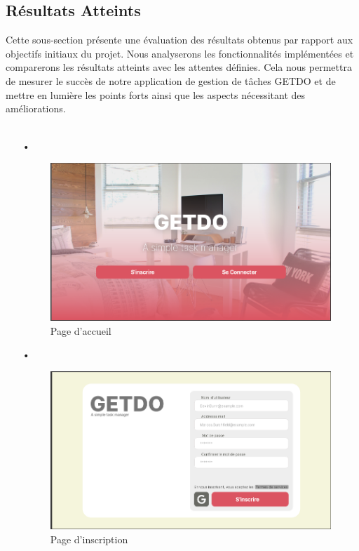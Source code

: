 \documentclass[a4paper,12pt]{report}
\begin{document}
    \subsection{Résultats Atteints}
    Cette sous-section présente une évaluation des résultats obtenus par rapport aux objectifs initiaux du projet. Nous analyserons les fonctionnalités implémentées et comparerons les résultats atteints avec les attentes définies. Cela nous permettra de mesurer le succès de notre application de gestion de tâches GETDO et de mettre en lumière les points forts ainsi que les aspects nécessitant des améliorations.\\ \\
    
    \begin{itemize}
       
      \item[•]\begin{figure}[h!]
          \includegraphics[width=1\textwidth]{./images/getdo_screenshot/getdo_land.png}
          \caption{Page d'accueil}
          \label{fig:jira_project_task}
        \end{figure}
        
      \item[•]\begin{figure}[h!]
          \includegraphics[width=1\textwidth]{./images/getdo_screenshot/getdo_inscription.png}
          \caption{Page d'inscription}
          \label{fig:jira_project_task}
        \end{figure}
        

\end{itemize}
\end{document}
